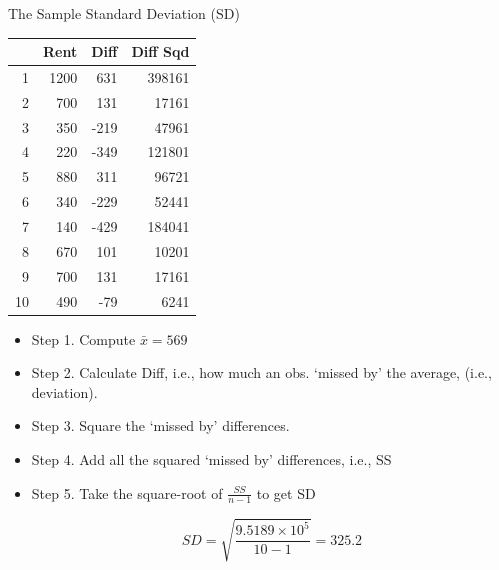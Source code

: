 \documentclass[14pt]{beamer}\usepackage[]{graphicx}\usepackage[]{color}
\begin{document}
\begin{frame}[fragile]{The Sample Standard Deviation (SD)}

\begin{minipage}[ht]{5cm}

{\footnotesize{
\begin{table}[ht]
\centering
\begin{tabular}{rrrr}
  \hline
 & Rent & Diff & Diff Sqd \\ 
  \hline
1 & 1200 & 631 & 398161 \\ 
  2 & 700 & 131 & 17161 \\ 
  3 & 350 & -219 & 47961 \\ 
  4 & 220 & -349 & 121801 \\ 
  5 & 880 & 311 & 96721 \\ 
  6 & 340 & -229 & 52441 \\ 
  7 & 140 & -429 & 184041 \\ 
  8 & 670 & 101 & 10201 \\ 
  9 & 700 & 131 & 17161 \\ 
  10 & 490 & -79 & 6241 \\ 
   \hline
\end{tabular}
\end{table}

}}

\end{minipage}
\begin{minipage}[ht]{6cm}

{\footnotesize{
\begin{itemize}
\item<1-> Step 1. Compute $\bar{x} = 569$
\item<2-> Step 2. Calculate Diff, i.e., how much an obs. `missed by' the average, (i.e., deviation).
\item<3-> Step 3. Square the `missed by' differences.
\item<4-> Step 4. Add all the squared `missed by' differences, i.e., SS
\item<5-> Step 5. Take the square-root of $\frac{SS}{n - 1}$ to get SD

\begin{equation*}
SD = \sqrt{ \frac{\ensuremath{9.5189\times 10^{5}}}{ 10 - 1 }} = 325.2
\end{equation*}

\end{itemize}
}}
\end{minipage}

\end{frame}
\end{document}
